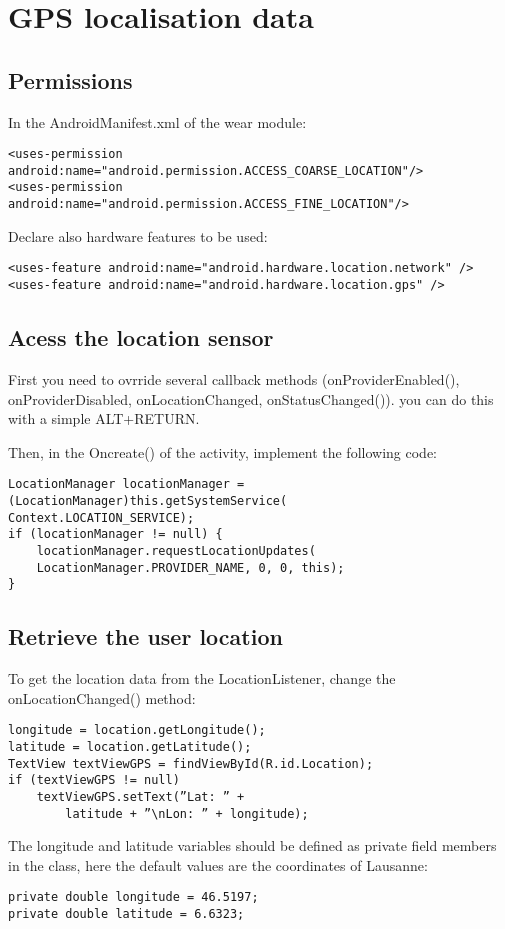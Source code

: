 \documentclass[11pt]{article}
\begin{document}
\section{GPS localisation data}
\subsection{Permissions}
In the AndroidManifest.xml of the wear module:
\begin{lstlisting}
<uses-permission android:name="android.permission.ACCESS_COARSE_LOCATION"/>
<uses-permission android:name="android.permission.ACCESS_FINE_LOCATION"/>
\end{lstlisting}
Declare also hardware features to be used:
\begin{lstlisting}
<uses-feature android:name="android.hardware.location.network" />
<uses-feature android:name="android.hardware.location.gps" />
\end{lstlisting}

\subsection{Acess the location sensor}
First you need to ovrride several callback methods (onProviderEnabled(), onProviderDisabled, onLocationChanged, onStatusChanged()). you can do this with a simple ALT+RETURN.

Then, in the Oncreate() of the activity, implement the following code:
\begin{lstlisting}
LocationManager locationManager = (LocationManager)this.getSystemService(
Context.LOCATION_SERVICE);
if (locationManager != null) {
    locationManager.requestLocationUpdates(
    LocationManager.PROVIDER_NAME, 0, 0, this);
}
\end{lstlisting}

\subsection{Retrieve the user location}
To get the location data from the LocationListener, change the onLocationChanged() method:
\begin{lstlisting}
longitude = location.getLongitude();
latitude = location.getLatitude();
TextView textViewGPS = findViewById(R.id.Location);
if (textViewGPS != null)
    textViewGPS.setText(”Lat: ” +
        latitude + ”\nLon: ” + longitude);
\end{lstlisting}
The longitude and latitude variables should be defined as private field members in the class, here the default values are the coordinates of Lausanne:
\begin{lstlisting}
private double longitude = 46.5197;
private double latitude = 6.6323;
\end{lstlisting}
\end{document}
